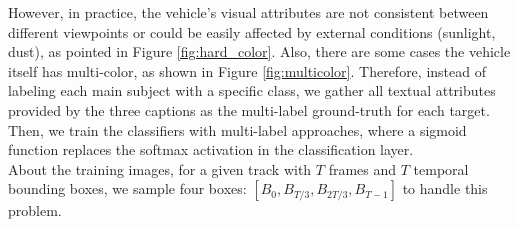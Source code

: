 However, in practice, the vehicle's visual attributes are not consistent between different viewpoints or could be easily affected by external conditions (sunlight, dust), as pointed in Figure \ref{fig:hard_color}. 
Also, there are some cases the vehicle itself has multi-color, as shown in Figure \ref{fig:multicolor}.
Therefore, instead of labeling each main subject with a specific class, we gather all textual attributes provided by the three captions as the multi-label ground-truth for each target. Then, we train the classifiers with multi-label approaches, where a sigmoid function replaces the softmax activation in the classification layer. \\
About the training images, for a given track with $T$ frames and $T$ temporal bounding boxes, we sample four boxes: $[B_0, B_{T/3}, B_{2T/3}, B_{T-1}]$ to handle this problem.
